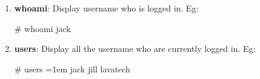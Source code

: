 
\begin{flushleft}
	
	\begin{enumerate}
		\item \textbf{whoami}: Display username who is logged in.
		\newline
		Eg:
		\begin{tcolorbox}[breakable,notitle,boxrule=-0pt,colback=black,colframe=black]
			\color{green}
			\# whoami
			\newline
			\color{white}
			jack
		\end{tcolorbox}
		\bigskip
		\bigskip
		
		\item \textbf{users}: Display all the username who are currently logged in.
		\newline
		Eg:
		\begin{tcolorbox}[breakable,notitle,boxrule=-0pt,colback=black,colframe=black]
			\color{green}
			\# users
			\newline
			\font=1em
			\color{white}
			jack jill lavatech
			\font=4pt
		\end{tcolorbox}
		
		\bigskip
		

\end{enumerate}
\end{flushleft}

